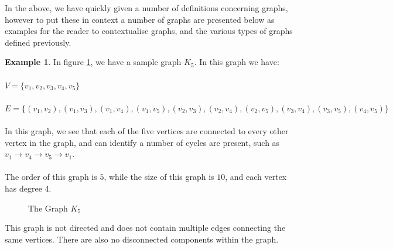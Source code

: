 \documentclass[11pt,reqno]{amsart}
\theoremstyle{definition}
\newtheorem{example}[thm]{Example}
\numberwithin{equation}{section}
\begin{document}
	\noindent In the above, we have quickly given a number of definitions concerning graphs, however to put these in context a number of graphs are presented below as examples for the reader to contextualise graphs, and the various types of graphs defined previously. 
	\begin{example}
		In figure \ref{fig:K5}, we have a sample graph $K_5$. In this graph we have:\\ \\$V=\{v_1,v_2,v_3,v_4,v_5\}$
		\\
		\\$E=\{(v_1,v_2), (v_1,v_3), (v_1,v_4), (v_1,v_5) ,(v_2,v_3), (v_2,v_4), (v_2,v_5),(v_3,v_4), (v_3,v_5), (v_4,v_5)\}$\\
		\\
		In this graph, we see that each of the five vertices are connected to every other vertex in the graph, and can identify a number of cycles are present, such as  $v_1 \rightarrow v_4 \rightarrow v_5 \rightarrow v_1$.\\
		\\
		The order of this graph is $5$, while the size of this graph is $10$, and each vertex has degree 4.
		\begin{figure}[h!]
	\caption{The Graph $K_5$}
	\label{fig:K5}
		\end{figure}
\end{example}
\noindent This graph is not directed and does not contain multiple edges connecting the same vertices. There are also no disconnected components within the graph.
\end{document}
